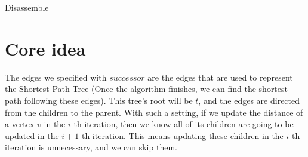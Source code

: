 \documentclass[a4paper,12pt]{article}
\begin{document}
\begin{algorithm}[H]
	\caption{Disassemble}
	\BlankLine
\end{algorithm}

\section*{Core idea}

The edges we specified with $successor$ are the edges that are used to represent the Shortest Path Tree (Once the algorithm finishes, we can find the shortest path following these edges).
This tree's root will be $t$, and the edges are directed from the children to the parent.
With such a setting, if we update the distance of a vertex $v$ in the $i$-th iteration, then we know all of its children are going to be updated in the $i+1$-th iteration.
This means updating these children in the $i$-th iteration is unnecessary, and we can skip them.
\end{document}
